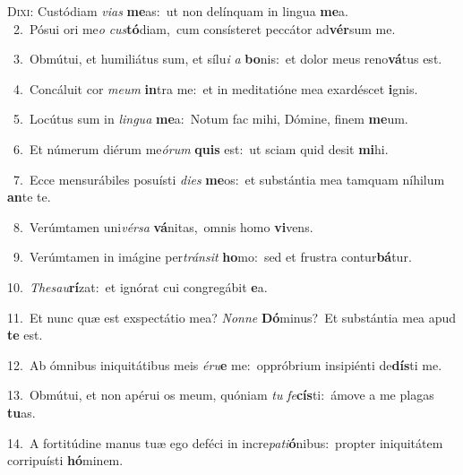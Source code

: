 \lettrine{\initial\textcolor{\initialcolor}{D}}{ixi:} Custódiam \textit{vi}\-\textit{as} \textbf{me}\-as:~\star ut non delínquam in lingua \textbf{me}\-a.\\
{\numbfont\textcolor{\numbcolor}{~2.}}~Pósui ori me\textit{o} \textit{cus}\-\textbf{tó}diam,~\star cum consísteret peccátor ad\-\textbf{vér}\-sum me.\par
{\numbfont\textcolor{\numbcolor}{~3.}}~Obmútui, et humiliátus sum, et sílu\textit{i} \textit{a} \textbf{bo}\-nis:~\star et dolor meus reno\-\textbf{vá}\-tus est.\par
{\numbfont\textcolor{\numbcolor}{~4.}}~Concáluit cor \textit{me}\-\textit{um} \textbf{in}\-tra me:~\star et in meditatióne mea exardéscet \textbf{i}\-gnis.\par
{\numbfont\textcolor{\numbcolor}{~5.}}~Locútus sum in \textit{lin}\-\textit{gua} \textbf{me}\-a:~\star Notum fac mihi, Dómine, finem \textbf{me}\-um.\par
{\numbfont\textcolor{\numbcolor}{~6.}}~Et númerum diérum me\-\textit{ó}\-\textit{rum} \textbf{quis} est:~\star ut sciam quid desit \textbf{mi}\-hi.\par
{\numbfont\textcolor{\numbcolor}{~7.}}~Ecce mensurábiles posuísti \textit{di}\-\textit{es} \textbf{me}\-os:~\star et substántia mea tamquam níhilum \textbf{an}\-te te.\par
{\numbfont\textcolor{\numbcolor}{~8.}}~Verúmtamen uni\-\textit{vér}\-\textit{sa} \textbf{vá}\-nitas,~\star omnis homo \textbf{vi}\-vens.\par
{\numbfont\textcolor{\numbcolor}{~9.}}~Verúmtamen in imágine per\-\textit{tráns}\-\textit{it} \textbf{ho}\-mo:~\star sed et frustra contur\-\textbf{bá}\-tur.\par
{\numbfont\textcolor{\numbcolor}{10.}}~\-\textit{The}\-\textit{sau}\textbf{rí}zat:~\star et ignórat cui congregábit \textbf{e}\-a.\par
{\numbfont\textcolor{\numbcolor}{11.}}~Et nunc quæ est exspectátio mea? \textit{Non}\-\textit{ne} \textbf{Dó}\-minus?~\star Et substántia mea apud \textbf{te} est.\par
{\numbfont\textcolor{\numbcolor}{12.}}~Ab ómnibus iniquitátibus meis \textit{é}\-\textit{ru}\textbf{e} me:~\star oppróbrium insipiénti de\-\textbf{dís}\-ti me.\par
{\numbfont\textcolor{\numbcolor}{13.}}~Obmútui, et non apérui os meum, quóniam \textit{tu} \textit{fe}\-\textbf{cís}ti:~\star ámove a me plagas \textbf{tu}\-as.\par
{\numbfont\textcolor{\numbcolor}{14.}}~A fortitúdine manus tuæ ego deféci in incre\-\textit{pa}\-\textit{ti}\textbf{ó}nibus:~\star propter iniquitátem corripuísti \textbf{hó}\-minem.\par
